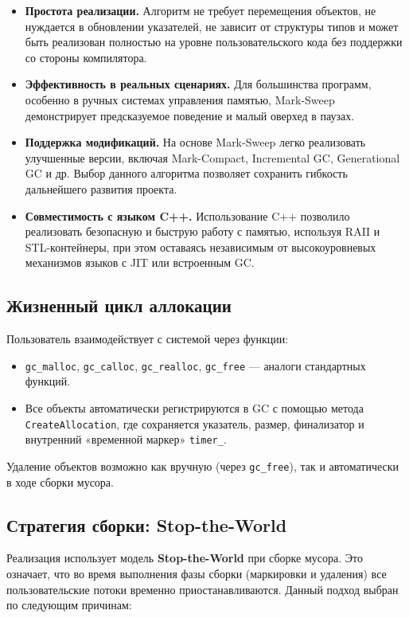 \begin{itemize}
    \item \textbf{Простота реализации.} Алгоритм не требует перемещения объектов, не нуждается в обновлении указателей, не зависит от структуры типов и может быть реализован полностью на уровне пользовательского кода без поддержки со стороны компилятора.
    \item \textbf{Эффективность в реальных сценариях.} Для большинства программ, особенно в ручных системах управления памятью, Mark-Sweep демонстрирует предсказуемое поведение и малый оверхед в паузах.
    \item \textbf{Поддержка модификаций.} На основе Mark-Sweep легко реализовать улучшенные версии, включая Mark-Compact, Incremental GC, Generational GC и др. Выбор данного алгоритма позволяет сохранить гибкость дальнейшего развития проекта.
    \item \textbf{Совместимость с языком C++.} Использование C++ позволило реализовать безопасную и быструю работу с памятью, используя RAII и STL-контейнеры, при этом оставаясь независимым от высокоуровневых механизмов языков с JIT или встроенным GC.
\end{itemize}

\subsection{Жизненный цикл аллокации}

Пользователь взаимодействует с системой через функции:
\begin{itemize}
    \item \texttt{gc\_malloc}, \texttt{gc\_calloc}, \texttt{gc\_realloc}, \texttt{gc\_free} — аналоги стандартных функций.
    \item Все объекты автоматически регистрируются в GC с помощью метода \\\texttt{CreateAllocation}, где сохраняется указатель, размер, финализатор и внутренний «временной маркер» \texttt{timer\_}.
\end{itemize}

Удаление объектов возможно как вручную (через \texttt{gc\_free}), так и автоматически в ходе сборки мусора.

\subsection{Стратегия сборки: Stop-the-World}

Реализация использует модель \textbf{Stop-the-World} при сборке мусора. Это означает, что во время выполнения фазы сборки (маркировки и удаления) все пользовательские потоки временно приостанавливаются. Данный подход выбран по следующим причинам:

